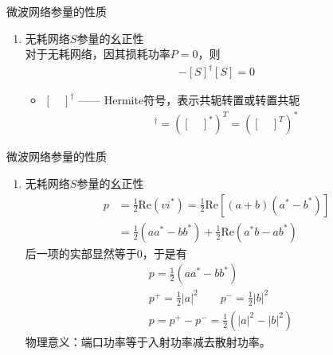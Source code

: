 \begin{frame}{微波网络参量的性质}
    \begin{enumerate}
        \resume
        \item 无耗网络$S$参量的幺正性\\
              对于无耗网络，因其损耗功率$P=0$，则
              \begin{gather*}
                  [I]-[S]^\dagger[S]=0
              \end{gather*}
              \begin{itemize}
                  \item $[\quad]^\dagger$ —— Hermite符号，表示共轭转置或转置共轭\\
                        \begin{align*}
                            [\quad]^\dagger=([\quad]^{*})^T=([\quad]^T)^{*}
                        \end{align*}
              \end{itemize}
    \end{enumerate}
\end{frame}

\begin{frame}{微波网络参量的性质}
    \begin{enumerate}
        \resume
        \item 无耗网络$S$参量的幺正性
              \begin{align*}
                  p & =\frac{1}{2}\mathrm{Re}(vi^*)=\frac{1}{2}\mathrm{Re}[(a+b)(a^*-b^*)] \\
                    & =\frac{1}{2}(aa^*-bb^*)+\frac{1}{2}\mathrm{Re}(a^*b-ab^*)
              \end{align*}
              后一项的实部显然等于$0$，于是有
              \begin{align*}
                   & p=\frac{1}{2}(aa^*-bb^*)                                               \\
                   & p^+=\frac{1}{2}\lvert a\rvert^2 \qquad p^-=\frac{1}{2}\lvert b\rvert^2 \\
                   & p=p^+-p^-=\frac{1}{2}(\lvert a\rvert^2-\lvert b\rvert^2)
              \end{align*}
              物理意义：端口功率等于入射功率减去散射功率。
    \end{enumerate}
\end{frame}

